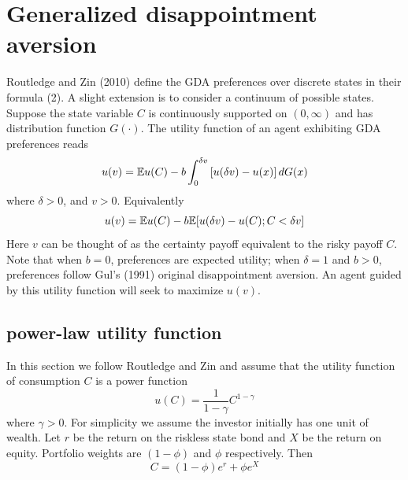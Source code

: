\documentclass{article}
\begin{document}


\section{Generalized disappointment aversion}
\label{sec:GDA}
Routledge and Zin (2010) \cite{routledge2010generalized} define the GDA
preferences over discrete states in their formula (2). A slight extension
is to consider a continuum of possible states. Suppose the state variable
$C$ is continuously supported on $(0, \infty)$ and has distribution
function $G(\cdot)$. The utility function of an agent exhibiting GDA
preferences reads
\begin{equation}
  u(v)= \E u(C) - b \int_{0}^{\delta v}
  \left[ u(\delta v) - u(x) \right] dG(x)\label{11}%
\end{equation}
where $\delta > 0$, and $v>0$. Equivalently
\begin{equation}
  \label{eq:xxie0}
  u(v) = \mathbb{E} u(C) - b \mathbb{E}[u(\delta v) - u(C); C < \delta v]
\end{equation}
Here $v$ can be thought of as the certainty payoff equivalent to the
risky payoff $C$. Note that when $b=0$, 
preferences are expected utility; when $\delta=1$ and $b>0$,
preferences follow Gul's (1991) original disappointment aversion.
An agent guided by this utility function will seek to maximize $u(v)$.

\subsection{power-law utility function}
In this section we follow Routledge and Zin
\cite{routledge2010generalized} and assume 
that the utility function of consumption $C$ is a power function%
\begin{equation}
  \label{eq:power_utility}
  u(C)=\frac{1}{1-\gamma}C^{1-\gamma}%
\end{equation}
where $\gamma > 0$. For simplicity we assume the investor
initially has one unit of wealth. Let $r$ be the return on the
riskless state bond and $X$ be the return on equity. Portfolio weights
are $\left(1-\phi\right)$ and $\phi$ respectively. Then
\begin{equation}
  \label{eq:xxie1}
  C = (1 - \phi) e^r + \phi e^X
\end{equation}
\end{document}
